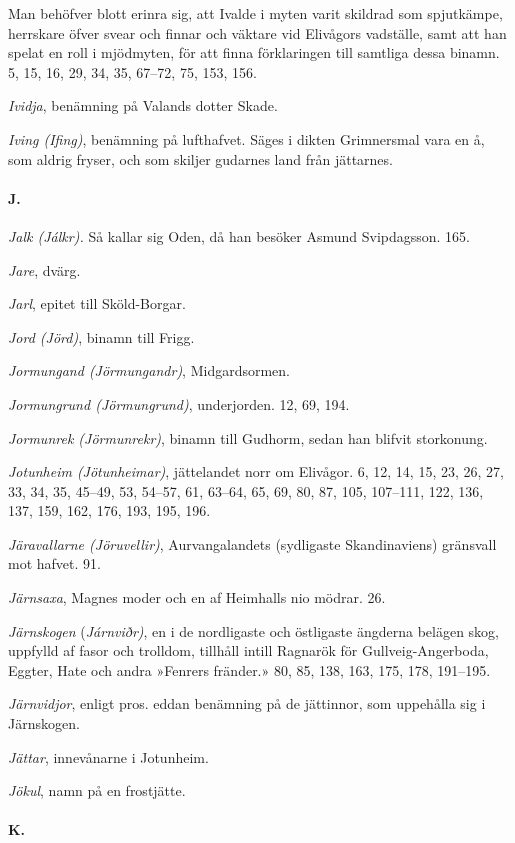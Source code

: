 Man behöfver blott erinra sig, att Ivalde i myten varit skildrad som
spjutkämpe, herrskare öfver svear och finnar och väktare vid Elivågors
vadställe, samt att han spelat en roll i mjödmyten, för att finna
förklaringen till samtliga dessa binamn. 5, 15, 16, 29, 34, 35, 67--72,
75, 153, 156.

\emph{Ividja}, benämning på Valands dotter Skade.

\emph{Iving (Ifing)}, benämning på lufthafvet. Säges i dikten
Grimnersmal vara en å, som aldrig fryser, och som skiljer gudarnes land
från jättarnes.

\paragraph{J.}

\emph{Jalk (Jálkr).} Så kallar sig Oden, då han besöker Asmund
Svipdagsson. 165.

\emph{Jare}, dvärg.

\emph{Jarl}, epitet till Sköld-Borgar.

\emph{Jord (Jörd)}, binamn till Frigg.

\emph{Jormungand (Jörmungandr)}, Midgardsormen.

\emph{Jormungrund (Jörmungrund)}, underjorden. 12, 69, 194.

\emph{Jormunrek (Jörmunrekr)}, binamn till Gudhorm, sedan han blifvit
storkonung.

\emph{Jotunheim (Jötunheimar)}, jättelandet norr om Elivågor. 6, 12, 14,
15, 23, 26, 27, 33, 34, 35, 45--49, 53, 54--57, 61, 63--64, 65, 69, 80,
87, 105, 107--111, 122, 136, 137, 159, 162, 176, 193, 195, 196.

\emph{Järavallarne (Jöruvellir)}, Aurvangalandets (sydligaste
Skandinaviens) gränsvall mot hafvet. 91.

\emph{Järnsaxa}, Magnes moder och en af Heimhalls nio mödrar. 26.

\emph{Järnskogen} (\emph{Járnviðr)}, en i de nordligaste och östligaste
ängderna belägen skog, uppfylld af fasor och trolldom, tillhåll intill
Ragnarök för Gullveig-Angerboda, Eggter, Hate och andra »Fenrers
fränder.» 80, 85, 138, 163, 175, 178, 191--195.

\emph{Järnvidjor}, enligt pros. eddan benämning på de jättinnor, som
uppehålla sig i Järnskogen.

\emph{Jättar}, innevånarne i Jotunheim.

\emph{Jökul}, namn på en frostjätte.

\paragraph{K.}

